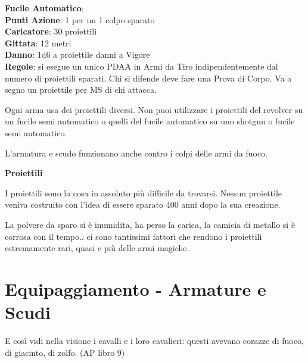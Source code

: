 \documentclass[12pt,a4paper,twoside,openany]{book}
\begin{document}
\begin{multicols}{2}
\textbf{Fucile Automatico}:\\
\textbf{Punti Azione}: 1 per un 1 colpo sparato\\
\textbf{Caricatore}: 30 proiettili\\
\textbf{Gittata}: 12 metri\\
\textbf{Danno}: 1d6 a proiettile danni a Vigore\\
\textbf{Regole}: si esegue un unico PDAA in Armi da Tiro indipendentemente dal numero di proiettili sparati. Chi si difende deve fare una Prova di Corpo. Va a segno un proiettile per MS di chi attacca.

\bigskip

Ogni arma usa dei proiettili diversi. Non puoi utilizzare i proiettili del revolver su un fucile semi automatico o quelli del fucile automatico su uno shotgun o fucile semi automatico.

L'armatura e scudo funzionano anche contro i colpi delle armi da fuoco.

\begin{center}
	\textbf{Proiettili}
\end{center}

I proiettili sono la cosa in assoluto più difficile da trovarsi. Nessun proiettile veniva costruito con l'idea di essere sparato 400 anni dopo la sua creazione.

La polvere da sparo si è inumidita, ha perso la carica, la camicia di metallo si è corrosa con il tempo.. ci sono tantissimi fattori che rendono i proiettili estremamente rari, quasi e più delle armi magiche.

\end{multicols}

\pagebreak

\section{Equipaggiamento - Armature e Scudi} \hypertarget{equipaggiamento.armature.scudi}{}\label{equipaggiamentoarmature}

\label{equipaggiamento---armature-e-scudi}

\begin{changemargin}{0.3cm}{0.3cm}\begin{enfasi}{
E così vidi nella visione i cavalli e i loro cavalieri: questi avevano corazze di fuoco, di giacinto, di zolfo. (AP libro 9)} \end{enfasi}\end{changemargin}\medskip
\end{document}
